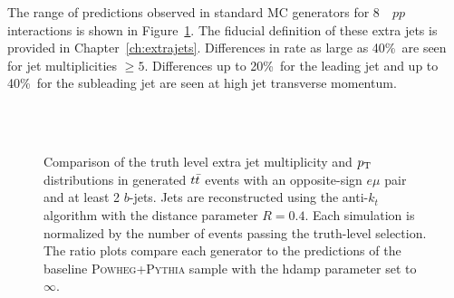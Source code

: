 The range of predictions observed in standard MC generators for
8~\TeV\ $pp$ interactions is shown in 
Figure~\ref{fig:introtjets}. The fiducial definition of these extra jets is provided in Chapter~\ref{ch:extrajets}.  
Differences in rate as large as 40\%\  are seen for
jet multiplicities $\ge 5$.  Differences up to 20\%\ for the leading
jet and up to 40\%\ for the subleading jet are seen at high jet transverse
momentum.  
\begin{figure}
\centering
{}
~
 \\
 ~
\caption{Comparison of the truth level extra jet multiplicity and $p_{\text{T}}$ distributions in generated $t\bar{t}$ events with an opposite-sign $e\mu$ pair and at least 2 $b$-jets.  Jets are reconstructed using the anti-$k_t$ algorithm with 
the distance parameter $R=0.4$.
Each simulation is normalized by the number of events passing the truth-level selection.
The ratio plots compare each generator to the predictions of the baseline \textsc{ Powheg+Pythia} sample with the hdamp parameter
set to $\infty$.}
\label{fig:introtjets}
\end{figure}

